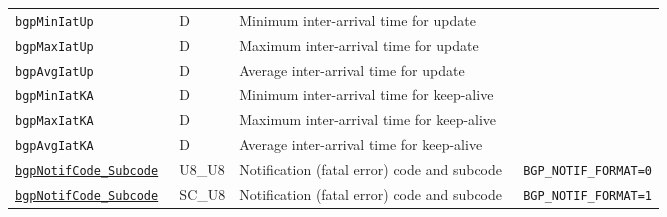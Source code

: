 \documentclass[documentation]{subfiles}
\begin{document}
\begin{longtable}{>{\tt}lll>{\tt\small}l}
    bgpMinIatUp                         & D            & Minimum inter-arrival time for update         & \\
    bgpMaxIatUp                         & D            & Maximum inter-arrival time for update         & \\
    bgpAvgIatUp                         & D            & Average inter-arrival time for update         & \\
    bgpMinIatKA                         & D            & Minimum inter-arrival time for keep-alive     & \\
    bgpMaxIatKA                         & D            & Maximum inter-arrival time for keep-alive     & \\
    bgpAvgIatKA                         & D            & Average inter-arrival time for keep-alive     & \\
    \hyperref[bgpNotifCodeSubcode]{bgpNotifCode\_Subcode}
                                        & U8\_U8       & Notification (fatal error) code and subcode   & BGP\_NOTIF\_FORMAT=0\\
    \hyperref[bgpNotifCodeSubcode]{bgpNotifCode\_Subcode}
                                        & SC\_U8       & Notification (fatal error) code and subcode   & BGP\_NOTIF\_FORMAT=1\\
    \bottomrule
\end{longtable}
\end{document}
